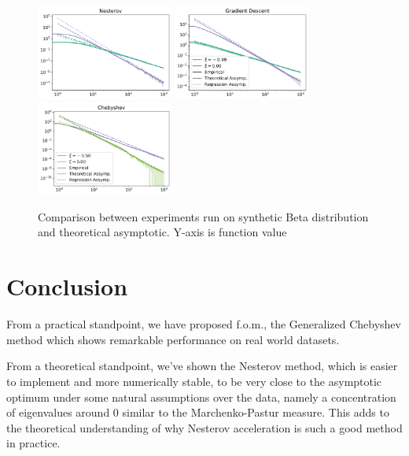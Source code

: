 \documentclass{article}
\begin{document}
\begin{figure}[H]
    \centering
    \includegraphics[width= 0.4\textwidth]{new_imgs/nesterov.png}
    \includegraphics[width= 0.4\textwidth]{new_imgs/GD.png}\\
        \includegraphics[width= 0.4\textwidth]{new_imgs/chebyshev.png}

    \caption{Comparison between experiments run on synthetic Beta distribution and theoretical asymptotic. Y-axis is function value }
    \label{fig: last figure}
\end{figure}




\section{Conclusion}
From a practical standpoint, we have proposed f.o.m., the Generalized Chebyshev method which shows remarkable performance on real world datasets. 

From a theoretical standpoint, we've shown the Nesterov method, which is easier to implement and more numerically stable, to be very close to the asymptotic optimum   under some natural assumptions over the data, namely a concentration of eigenvalues around $0$ similar to the Marchenko-Pastur measure. This adds to the theoretical understanding of why Nesterov acceleration is such a good method in practice. 
\end{document}
